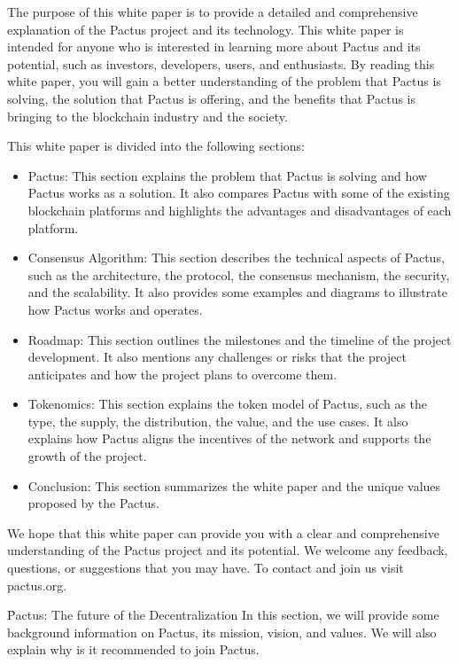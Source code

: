\documentclass{novel}
\begin{document}
The purpose of this white paper is to provide a detailed and comprehensive explanation of the Pactus project and its technology. This white paper is intended for anyone who is interested in learning more about Pactus and its potential, such as investors, developers, users, and enthusiasts. By reading this white paper, you will gain a better understanding of the problem that Pactus is solving, the solution that Pactus is offering, and the benefits that Pactus is bringing to the blockchain industry and the society.

This white paper is divided into the following sections:
\begin{itemize}
  \item
        Pactus: This section explains the problem that Pactus is solving and how Pactus works as a solution. It also compares Pactus with some of the existing blockchain platforms and highlights the advantages and disadvantages of each platform.
  \item
        Consensus Algorithm: This section describes the technical aspects of Pactus, such as the architecture, the protocol, the consensus mechanism, the security, and the scalability. It also provides some examples and diagrams to illustrate how Pactus works and operates.
  \item
        Roadmap: This section outlines the milestones and the timeline of the project development. It also mentions any challenges or risks that the project anticipates and how the project plans to overcome them.
  \item
        Tokenomics: This section explains the token model of Pactus, such as the type, the supply, the distribution, the value, and the use cases. It also explains how Pactus aligns the incentives of the network and supports the growth of the project.
  \item
        Conclusion: This section summarizes the white paper and the unique values proposed by the Pactus.
\end{itemize}

We hope that this white paper can provide you with a clear and comprehensive understanding of the Pactus project and its potential. We welcome any feedback, questions, or suggestions that you may have. To contact and join us visit pactus.org.

\h{Pactus: The future of the Decentralization}
In this section, we will provide some background information on Pactus, its mission, vision, and values. We will also explain why is it recommended to join Pactus.
\end{document}
